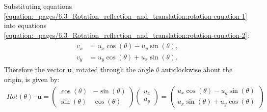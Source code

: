 \documentclass[letterpaper,10pt,english]{jupyterBook}
\begin{document}
\sphinxAtStartPar
Substituting equations \eqref{equation:_pages/6.3_Rotation_reflection_and_translation:rotation-equation-1} into equations \eqref{equation:_pages/6.3_Rotation_reflection_and_translation:rotation-equation-2}:
\begin{equation*}
\begin{split} \begin{align*}
    v_x &= u_x \cos(\theta) - u_y \sin(\theta), \\
    v_y &= u_y \cos(\theta) + u_x \sin(\theta).
\end{align*} \end{split}
\end{equation*}
\sphinxAtStartPar
Therefore the vector \(\mathbf{u}\), rotated through the angle \(\theta\) anti\sphinxhyphen{}clockwise about the origin, is given by:
\begin{equation*}
\begin{split} Rot(\theta) \cdot \mathbf{u} =
    \begin{pmatrix} \cos(\theta) & -\sin(\theta) \\ \sin(\theta) & \cos(\theta) \end{pmatrix}
    \begin{pmatrix} u_x \\ u_y \end{pmatrix} =
    \begin{pmatrix}
        u_x \cos(\theta) - u_y \sin(\theta) \\
        u_x \sin(\theta) + u_y \cos(\theta)
    \end{pmatrix} \end{split}
\end{equation*}\label{_pages/6.3_Rotation_reflection_and_translation:rotation-in-R2-theorem}
\end{document}
